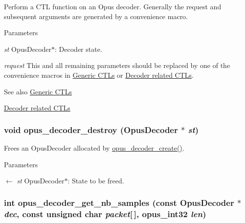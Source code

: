 Perform a CTL function on an Opus decoder. Generally the request and subsequent arguments are generated by a convenience macro. 
\begin{DoxyParams}{Parameters}
\item[{\em st}]{\ttfamily OpusDecoder$\ast$}: Decoder state. \item[{\em request}]This and all remaining parameters should be replaced by one of the convenience macros in \hyperlink{group__opus__genericctls}{Generic CTLs} or \hyperlink{group__opus__decoderctls}{Decoder related CTLs}. \end{DoxyParams}
\begin{DoxySeeAlso}{See also}
\hyperlink{group__opus__genericctls}{Generic CTLs} 

\hyperlink{group__opus__decoderctls}{Decoder related CTLs} 
\end{DoxySeeAlso}
\hypertarget{group__opus__decoder_gafebf4cb3c29c9317cac385446a76e36e}{
\subsubsection[{opus\_\-decoder\_\-destroy}]{\setlength{\rightskip}{0pt plus 5cm}void opus\_\-decoder\_\-destroy ({\bf OpusDecoder} $\ast$ {\em st})}}
\label{group__opus__decoder_gafebf4cb3c29c9317cac385446a76e36e}


Frees an {\ttfamily OpusDecoder} allocated by \hyperlink{group__opus__decoder_ga753f6fe0b699c81cfd47d70c8e15a0bd}{opus\_\-decoder\_\-create()}. 
\begin{DoxyParams}{Parameters}
\item[\mbox{$\leftarrow$} {\em st}]{\ttfamily OpusDecoder$\ast$}: State to be freed. \end{DoxyParams}
\hypertarget{group__opus__decoder_ga659135a16060f85908f63443a2325118}{
\subsubsection[{opus\_\-decoder\_\-get\_\-nb\_\-samples}]{\setlength{\rightskip}{0pt plus 5cm}int opus\_\-decoder\_\-get\_\-nb\_\-samples (const {\bf OpusDecoder} $\ast$ {\em dec}, \/  const unsigned char {\em packet}\mbox{[}$\,$\mbox{]}, \/  {\bf opus\_\-int32} {\em len})}}
\label{group__opus__decoder_ga659135a16060f85908f63443a2325118}


